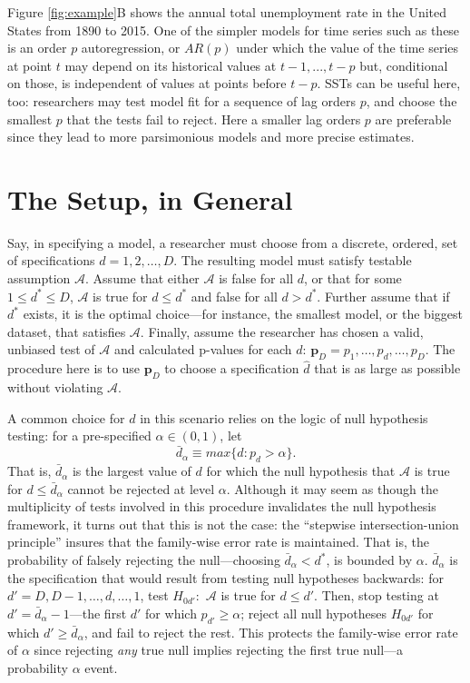 \documentclass[12pt]{article}\usepackage[]{graphicx}\usepackage[]{color}
\newcommand{\dalphaU}{\bar{d}_\alpha}
\newcommand{\dstar}{d^*}
\begin{document}
Figure \ref{fig:example}B shows the annual total unemployment rate in the
United States from 1890 to 2015.
One of the simpler models for time series such as these is an order
$p$ autoregression, or $AR(p)$ under which the value of the time
series at point $t$ may depend on its historical values at
$t-1,...,t-p$ but, conditional on those, is independent of values at
points before $t-p$.
SSTs can be useful here, too: researchers may test model fit for a
sequence of lag orders $p$, and choose the smallest $p$ that the tests
fail to reject.
Here a smaller lag orders $p$ are preferable since they lead to more
parsimonious models and more precise estimates.



\section{The Setup, in General}\label{sec:setup}

Say, in specifying a model, a researcher must choose from a discrete,
ordered, set of specifications $d=1,2,\dots,D$.
The resulting model must satisfy testable assumption $\mathcal{A}$.
Assume that either $\mathcal{A}$ is false for all $d$, or that for
some $1\le \dstar\le D$, $\mathcal{A}$ is true for $d\le \dstar$ and false
for all $d>\dstar$.
Further assume that if $\dstar$ exists, it is the optimal choice---for
instance, the smallest model, or the biggest dataset, that satisfies
$\mathcal{A}$.
Finally, assume the researcher has chosen a valid, unbiased test of
$\mathcal{A}$ and calculated p-values for each $d$:
$\bm{p}_D=p_1,\dots,p_d,\dots,p_D$.
The procedure here is to use $\bm{p}_D$ to choose a specification
$\hat{d}$ that is as large as possible without violating
$\mathcal{A}$.


A common choice for $d$ in this scenario relies on the logic of null
hypothesis testing: for a pre-specified $\alpha \in (0,1)$, let
\begin{equation*}
\dalphaU \equiv max\{d : p_d>\alpha\}.
\end{equation*}
That is, $\dalphaU$ is the largest value of $d$ for which the
null hypothesis that $\mathcal{A}$ is true for $d\le \dalphaU$
cannot be rejected at level $\alpha$.
Although it may seem as though the multiplicity of tests involved in
this procedure invalidates the null hypothesis framework, it turns out
that this is not the case: the ``stepwise intersection-union
principle'' \citet{berger1988, rosenbaum2008,hansen2015} insures that the
family-wise error rate is maintained.
That is, the probability of falsely rejecting the null---choosing
$\dalphaU<\dstar$, is bounded by $\alpha$.
$\dalphaU$ is the specification that would result from testing null
hypotheses backwards: for $d'=D,D-1,\dots,d,\dots,1$, test $H_{0d'}:$
$\mathcal{A}$ is true for $d\le d'$.
Then, stop testing at $d'=\dalphaU -1$---the first $d'$ for which
$p_{d'} \ge \alpha$; reject all null hypotheses $H_{0d'}$ for which
$d'\ge \dalphaU$, and fail to reject the rest.
This protects the family-wise error rate of $\alpha$ since rejecting
\emph{any} true null implies rejecting the first true null---a
probability $\alpha$ event.
\end{document}
